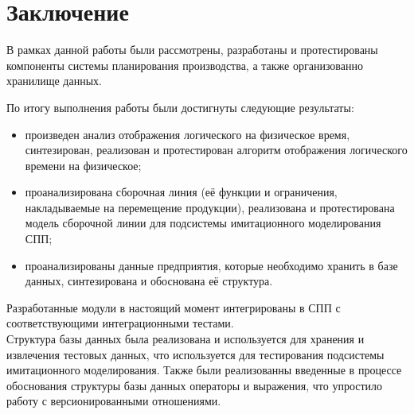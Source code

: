 \section*{Заключение}
В рамках данной работы были рассмотрены, разработаны и протестированы компоненты системы планирования производства, а также организованно хранилище данных.

По итогу выполнения работы были достигнуты следующие результаты:
\begin{itemize}
	\item произведен анализ отображения логического на физическое время, синтезирован, реализован и протестирован алгоритм отображения логического времени на физическое;
	\item проанализирована сборочная линия (её функции и ограничения, накладываемые на перемещение продукции), реализована и протестирована модель сборочной линии для подсистемы имитационного моделирования СПП;
	\item проанализированы данные предприятия, которые необходимо хранить в базе данных, синтезирована и обоснована её структура.
\end{itemize}

\indent Разработанные модули в настоящий момент интегрированы в СПП с соответствующими интеграционными тестами.\\
\indent Структура базы данных была реализована и используется для хранения и извлечения тестовых данных, что используется для тестирования подсистемы имитационного моделирования. 
Также были реализованны введенные в процессе обоснования структуры базы данных операторы и выражения, что упростило работу с версионированными отношениями.

\
